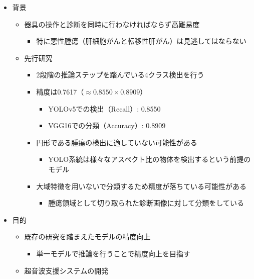 \documentclass{ujarticle}
\begin{document}
        \begin{itemize}
            \item 背景
            \begin{itemize}
                \item 器具の操作と診断を同時に行わなければならず高難易度
                \begin{itemize}
                    \item 特に悪性腫瘍（肝細胞がんと転移性肝がん）は見逃してはならない
                \end{itemize}
                \item 先行研究
                \begin{itemize}
                    \item 2段階の推論ステップを踏んでいる4クラス検出を行う
                    \item 精度は0.7617（$\approx 0.8550 \times 0.8909$）
                    \begin{itemize}
                        \item YOLOv5での検出（Recall）: 0.8550
                        \item VGG16での分類（Accuracy）: 0.8909
                    \end{itemize}
                    \item 円形である腫瘍の検出に適していない可能性がある
                    \begin{itemize}
                        \item YOLO系統は様々なアスペクト比の物体を検出するという前提のモデル
                    \end{itemize}
                    \item 大域特徴を用いないで分類するため精度が落ちている可能性がある
                    \begin{itemize}
                        \item 腫瘍領域として切り取られた診断画像に対して分類をしている
                    \end{itemize}
                \end{itemize}
            \end{itemize}
            \item 目的
            \begin{itemize}
                \item 既存の研究を踏まえたモデルの精度向上
                \begin{itemize}
                    \item 単一モデルで推論を行うことで精度向上を目指す
                \end{itemize}
                \item 超音波支援システムの開発
            \end{itemize}
        \end{itemize}
\end{document}
